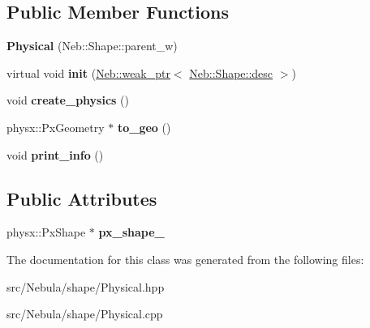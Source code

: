 \subsection*{\-Public \-Member \-Functions}
\begin{DoxyCompactItemize}
\item 
\hypertarget{classNeb_1_1Shape_1_1Physical_a653b6819feedfd5f425769bdc5fe5665}{{\bfseries \-Physical} (\-Neb\-::\-Shape\-::parent\-\_\-w)}\label{classNeb_1_1Shape_1_1Physical_a653b6819feedfd5f425769bdc5fe5665}

\item 
\hypertarget{classNeb_1_1Shape_1_1Physical_a70b5d338ce2aa6ee1b929a7a3bb2fb93}{virtual void {\bfseries init} (\hyperlink{classNeb_1_1weak__ptr}{\-Neb\-::weak\-\_\-ptr}$<$ \hyperlink{classNeb_1_1Shape_1_1desc}{\-Neb\-::\-Shape\-::desc} $>$)}\label{classNeb_1_1Shape_1_1Physical_a70b5d338ce2aa6ee1b929a7a3bb2fb93}

\item 
\hypertarget{classNeb_1_1Shape_1_1Physical_a383490671f6f3792915196b643fcae3f}{void {\bfseries create\-\_\-physics} ()}\label{classNeb_1_1Shape_1_1Physical_a383490671f6f3792915196b643fcae3f}

\item 
\hypertarget{classNeb_1_1Shape_1_1Physical_a04188cb00ee118ccfa4c84c2593b46d9}{physx\-::\-Px\-Geometry $\ast$ {\bfseries to\-\_\-geo} ()}\label{classNeb_1_1Shape_1_1Physical_a04188cb00ee118ccfa4c84c2593b46d9}

\item 
\hypertarget{classNeb_1_1Shape_1_1Physical_a3c7de2f4c8d96a0c9e7772d793b2bc41}{void {\bfseries print\-\_\-info} ()}\label{classNeb_1_1Shape_1_1Physical_a3c7de2f4c8d96a0c9e7772d793b2bc41}

\end{DoxyCompactItemize}
\subsection*{\-Public \-Attributes}
\begin{DoxyCompactItemize}
\item 
\hypertarget{classNeb_1_1Shape_1_1Physical_a42b1c4b3243313c543d08817cf4d7fdf}{physx\-::\-Px\-Shape $\ast$ {\bfseries px\-\_\-shape\-\_\-}}\label{classNeb_1_1Shape_1_1Physical_a42b1c4b3243313c543d08817cf4d7fdf}

\end{DoxyCompactItemize}


\-The documentation for this class was generated from the following files\-:\begin{DoxyCompactItemize}
\item 
src/\-Nebula/shape/\-Physical.\-hpp\item 
src/\-Nebula/shape/\-Physical.\-cpp\end{DoxyCompactItemize}
